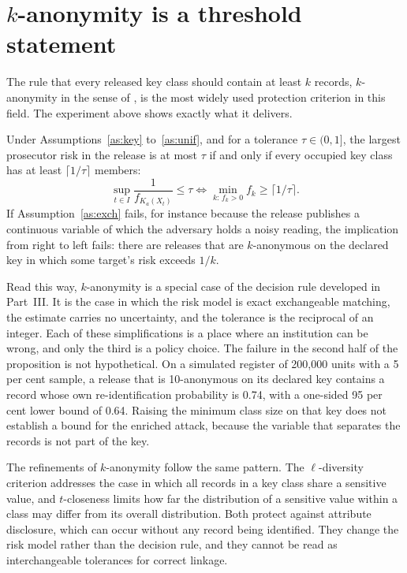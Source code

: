 \section{$k$-anonymity is a threshold statement}

The rule that every released key class should contain at least $k$ records,
$k$-anonymity in the sense of \citet{sweeney2002}, is the most widely used
protection criterion in this field. The experiment above shows exactly what it
delivers.

\begin{proposition}\label{prop:kanon}
Under Assumptions~\ref{as:key} to~\ref{as:unif}, and for a tolerance
$\tau \in (0,1]$, the largest prosecutor risk in the release is at most $\tau$ if
and only if every occupied key class has at least $\lceil 1/\tau \rceil$ members:
\begin{equation}\label{eq:kanon}
\sup_{t \in I} \frac{1}{f_{K_a(X_t)}} \le \tau
\iff \min_{k:\,f_k>0} f_k \ge \lceil 1/\tau \rceil .
\end{equation}
If Assumption~\ref{as:exch} fails, for instance because the release publishes a
continuous variable of which the adversary holds a noisy reading, the implication
from right to left fails: there are releases that are $k$-anonymous on the declared
key in which some target's risk exceeds $1/k$.
\end{proposition}

Read this way, $k$-anonymity is a special case of the decision rule developed in
Part~III. It is the case in which the risk model is exact exchangeable matching,
the estimate carries no uncertainty, and the tolerance is the reciprocal of an
integer. Each of these simplifications is a place where an institution can be
wrong, and only the third is a policy choice. The failure in the second half of
the proposition is not hypothetical. On a simulated register of 200,000 units with
a 5 per cent sample, a release that is 10-anonymous on its declared key contains a
record whose own re-identification probability is 0.74, with a one-sided 95 per
cent lower bound of 0.64. Raising the minimum class size on that key does not
establish a bound for the enriched attack, because the variable that separates the
records is not part of the key.

The refinements of $k$-anonymity follow the same pattern. The $\ell$-diversity
criterion \citep{machanavajjhala2007} addresses the case in which all records in a
key class share a sensitive value, and $t$-closeness \citep{li2007} limits how far
the distribution of a sensitive value within a class may differ from its overall
distribution. Both protect against attribute disclosure, which can occur without
any record being identified. They change the risk model rather than the decision
rule, and they cannot be read as interchangeable tolerances for correct linkage.

